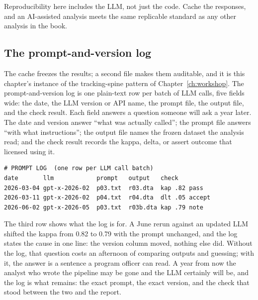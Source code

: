 \documentclass[
    a4paper,
    fontsize=10pt,
    twoside=true,
    numbers=noenddot,
]{kaobook}
\begin{document}
Reproducibility here includes the LLM, not just the code. Cache the responses, and an AI-assisted analysis meets the same replicable standard as any other analysis in the book.

\subsection{The prompt-and-version log}\label{ch13-sc-promptlog}
The cache freezes the results; a second file makes them auditable, and it is this chapter's instance of the tracking-spine pattern of Chapter~\ref{ch:workshop}. The prompt-and-version log is one plain-text row per batch of LLM calls, five fields wide: the date, the LLM version or API name, the prompt file, the output file, and the check result. Each field answers a question someone will ask a year later. The date and version answer \enquote{what was actually called}; the prompt file answers \enquote{with what instructions}; the output file names the frozen dataset the analysis read; and the check result records the kappa, delta, or assert outcome that licensed using it.
\par
{\footnotesize
\begin{verbatim}
# PROMPT LOG  (one row per LLM call batch)
date       llm            prompt   output   check
2026-03-04 gpt-x-2026-02  p03.txt  r03.dta  kap .82 pass
2026-03-11 gpt-x-2026-02  p04.txt  r04.dta  dlt .05 accept
2026-06-02 gpt-x-2026-05  p03.txt  r03b.dta kap .79 note
\end{verbatim}
}
The third row shows what the log is for. A June rerun against an updated LLM shifted the kappa from 0.82 to 0.79 with the prompt unchanged, and the log states the cause in one line: the version column moved, nothing else did. Without the log, that question costs an afternoon of comparing outputs and guessing; with it, the answer is a sentence a program officer can read. A year from now the analyst who wrote the pipeline may be gone and the LLM certainly will be, and the log is what remains: the exact prompt, the exact version, and the check that stood between the two and the report.
\end{document}
